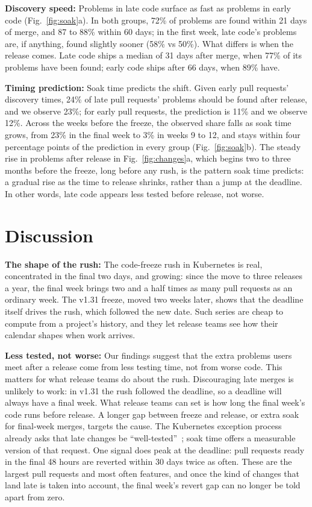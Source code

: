 \documentclass[10pt,conference]{IEEEtran}
\begin{document}
\textbf{Discovery speed:} Problems in late code surface as fast as problems in early code (Fig.~\ref{fig:soak}a). In both groups, 72\% of problems are found within 21 days of merge, and 87 to 88\% within 60 days; in the first week, late code's problems are, if anything, found slightly sooner (58\% vs 50\%). What differs is when the release comes. Late code ships a median of 31 days after merge, when 77\% of its problems have been found; early code ships after 66 days, when 89\% have.

\textbf{Timing prediction:} Soak time predicts the shift. Given early pull requests' discovery times, 24\% of late pull requests' problems should be found after release, and we observe 23\%; for early pull requests, the prediction is 11\% and we observe 12\%. Across the weeks before the freeze, the observed share falls as soak time grows, from 23\% in the final week to 3\% in weeks 9 to 12, and stays within four percentage points of the prediction in every group (Fig.~\ref{fig:soak}b). The steady rise in problems after release in Fig.~\ref{fig:changes}a, which begins two to three months before the freeze, long before any rush, is the pattern soak time predicts: a gradual rise as the time to release shrinks, rather than a jump at the deadline. In other words, late code appears less tested before release, not worse.

\section{Discussion}

\textbf{The shape of the rush:} The code-freeze rush in Kubernetes is real, concentrated in the final two days, and growing: since the move to three releases a year, the final week brings two and a half times as many pull requests as an ordinary week. The v1.31 freeze, moved two weeks later, shows that the deadline itself drives the rush, which followed the new date. Such series are cheap to compute from a project's history, and they let release teams see how their calendar shapes when work arrives.

\textbf{Less tested, not worse:} Our findings suggest that the extra problems users meet after a release come from less testing time, not from worse code. This matters for what release teams do about the rush. Discouraging late merges is unlikely to work: in v1.31 the rush followed the deadline, so a deadline will always have a final week. What release teams can set is how long the final week's code runs before release. A longer gap between freeze and release, or extra soak for final-week merges, targets the cause. The Kubernetes exception process already asks that late changes be ``well-tested''~\cite{k8sphases}; soak time offers a measurable version of that request. One signal does peak at the deadline: pull requests ready in the final 48 hours are reverted within 30 days twice as often. These are the largest pull requests and most often features, and once the kind of changes that land late is taken into account, the final week's revert gap can no longer be told apart from zero.
\end{document}
